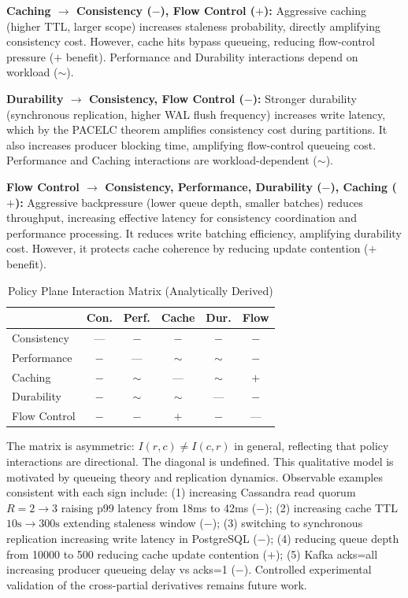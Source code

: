 \documentclass[conference]{IEEEtran}
\begin{document}
{{\textbf{Caching $\to$ Consistency ($-$), Flow Control ($+$):} Aggressive caching (higher TTL, larger scope) increases staleness probability, directly amplifying consistency cost. However, cache hits bypass queueing, reducing flow-control pressure ($+$ benefit). Performance and Durability interactions depend on workload ($\sim$).

\textbf{Durability $\to$ Consistency, Flow Control ($-$):} Stronger durability (synchronous replication, higher WAL flush frequency) increases write latency, which by the PACELC theorem amplifies consistency cost during partitions. It also increases producer blocking time, amplifying flow-control queueing cost. Performance and Caching interactions are workload-dependent ($\sim$).

\textbf{Flow Control $\to$ Consistency, Performance, Durability ($-$), Caching ($+$):} Aggressive backpressure (lower queue depth, smaller batches) reduces throughput, increasing effective latency for consistency coordination and performance processing. It reduces write batching efficiency, amplifying durability cost. However, it protects cache coherence by reducing update contention ($+$ benefit).}

\begin{table}[t]
{\color{red}
\caption{Policy Plane Interaction Matrix (Analytically Derived)}}
\label{tab:interactions}
\centering
\small
\begin{tabular}{@{}l c c c c c@{}}
\toprule
& Con. & Perf. & Cache & Dur. & Flow \\
\midrule
Consistency & --- & $-$ & $-$ & $-$ & $-$ \\
Performance & $-$ & --- & $\sim$ & $\sim$ & $-$ \\
Caching & $-$ & $\sim$ & --- & $\sim$ & $+$ \\
Durability & $-$ & $\sim$ & $\sim$ & --- & $-$ \\
Flow Control & $-$ & $-$ & $+$ & $-$ & --- \\
\bottomrule
\end{tabular}
\end{table}

{\color{red}
The matrix is asymmetric: $I(r,c) \neq I(c,r)$ in general, reflecting that policy interactions are directional. The diagonal is undefined. This qualitative model is motivated by queueing theory and replication dynamics. Observable examples consistent with each sign include: (1) increasing Cassandra read quorum $R=2\to3$ raising p99 latency from 18ms to 42ms ($-$); (2) increasing cache TTL $10\text{s}\to300\text{s}$ extending staleness window ($-$); (3) switching to synchronous replication increasing write latency in PostgreSQL ($-$); (4) reducing queue depth from 10000 to 500 reducing cache update contention ($+$); (5) Kafka acks=all increasing producer queueing delay vs acks=1 ($-$). Controlled experimental validation of the cross-partial derivatives remains future work.}

}
\end{document}
